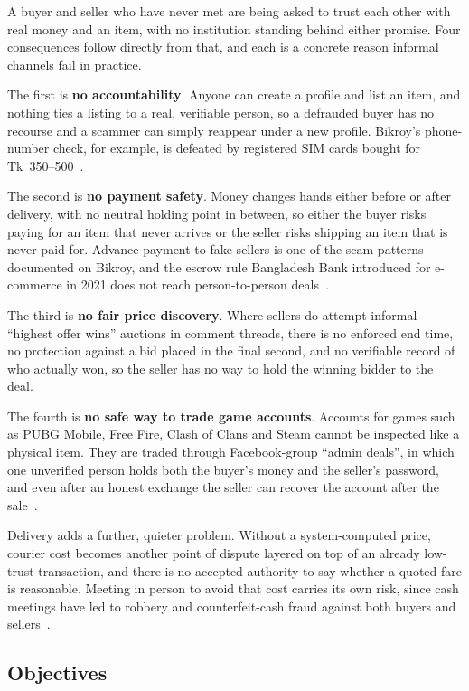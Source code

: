 \documentclass[11pt,a4paper]{article}
\begin{document}
A buyer and seller who have never met are being asked to trust each other with real money and an
item, with no institution standing behind either promise. Four consequences follow directly from
that, and each is a concrete reason informal channels fail in practice.

The first is \textbf{no accountability}. Anyone can create a profile and list an item, and nothing
ties a listing to a real, verifiable person, so a defrauded buyer has no recourse and a scammer can
simply reappear under a new profile. Bikroy's phone-number check, for example, is defeated by
registered SIM cards bought for Tk~350--500~\cite[\S3.2]{supp}.

The second is \textbf{no payment safety}. Money changes hands either before or after delivery, with
no neutral holding point in between, so either the buyer risks paying for an item that never arrives
or the seller risks shipping an item that is never paid for. Advance payment to fake sellers is one
of the scam patterns documented on Bikroy, and the escrow rule Bangladesh Bank introduced for
e-commerce in 2021 does not reach person-to-person deals~\cite[\S3.2, \S3.5]{supp}.

The third is \textbf{no fair price discovery}. Where sellers do attempt informal ``highest offer
wins'' auctions in comment threads, there is no enforced end time, no protection against a bid
placed in the final second, and no verifiable record of who actually won, so the seller has no way to
hold the winning bidder to the deal.

The fourth is \textbf{no safe way to trade game accounts}. Accounts for games such as PUBG Mobile,
Free Fire, Clash of Clans and Steam cannot be inspected like a physical item. They are traded through
Facebook-group ``admin deals'', in which one unverified person holds both the buyer's money and the
seller's password, and even after an honest exchange the seller can recover the account after the
sale~\cite[\S5.2]{supp}.

Delivery adds a further, quieter problem. Without a system-computed price, courier cost becomes
another point of dispute layered on top of an already low-trust transaction, and there is no accepted
authority to say whether a quoted fare is reasonable. Meeting in person to avoid that cost carries its
own risk, since cash meetings have led to robbery and counterfeit-cash fraud against both buyers and
sellers~\cite[\S3.2]{supp}.

\subsection{Objectives}
\end{document}
